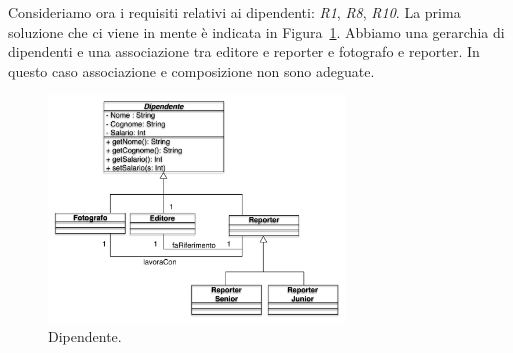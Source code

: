 \documentclass{article}
\begin{document}
\clearpage
Consideriamo ora i requisiti relativi ai dipendenti: \emph{R1}, \emph{R8}, \emph{R10}.  La prima soluzione che ci viene in mente \`e indicata in Figura~\ref{Fig:dipendente}. Abbiamo una gerarchia di dipendenti e una associazione tra editore e reporter e fotografo e reporter. In questo caso associazione e composizione non sono adeguate. 
\begin{figure}[h!]
  \centering
    \includegraphics[width=0.7\textwidth]{Img/dipendente.pdf}
 \caption{Dipendente.}
      \label{Fig:dipendente}
\end{figure}
\end{document}
